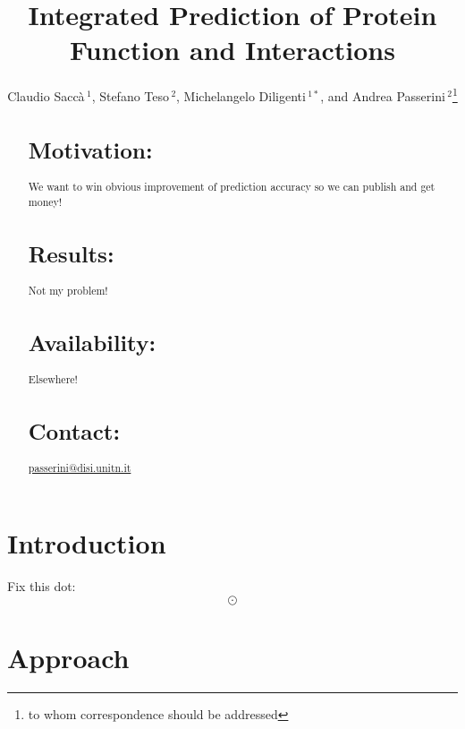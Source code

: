 \documentclass{bioinfo}
\begin{document}

\title[short Title]{Integrated Prediction of Protein Function and Interactions}
\author[Sample \textit{et~al}]{Claudio Sacc\`a\,$^{1}$, Stefano Teso\,$^{2}$, Michelangelo Diligenti\,$^{1*}$, and Andrea Passerini\,$^2$\footnote{to whom correspondence should be addressed}}
\address{
    $^{1}$Dipartimento di Ingegneria dell'Informazione e Scienze Matematiche, University of Siena, Siena, Italy\\
    $^{2}$Dipartimento di Ingegneria e Scienza dell'Informazione, University of Trento, Trento, Italy
}

\maketitle

\begin{abstract}

\section{Motivation:}
We want to win obvious improvement of prediction accuracy so we can publish
and get money!

\section{Results:}
Not my problem!

\section{Availability:}
Elsewhere!

\section{Contact:} \href{Andrea Passerini}{passerini@disi.unitn.it}
\end{abstract}



\section{Introduction}

Fix this dot:
$$ \odot $$



\section{Approach}
\end{document}
